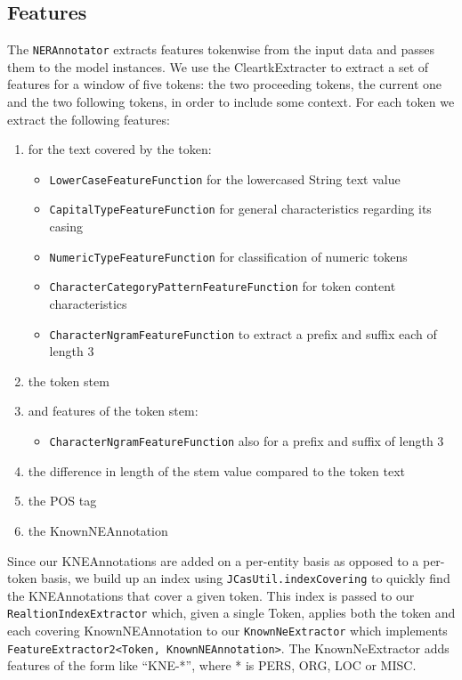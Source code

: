 \documentclass{article}
\begin{document}
\subsection{Features}\label{sec:features}
The \texttt{NERAnnotator} extracts features tokenwise from the input data and passes them to the model instances. We use the CleartkExtracter to extract a set of features for a window of five tokens: the two proceeding tokens, the current one and the two following tokens, in order to include some context. For each token we extract the following features:
\begin{enumerate}
	\item for the text covered by the token:
		\begin{itemize}
			\item \texttt{LowerCaseFeatureFunction} for the lowercased String text value
			\item \texttt{CapitalTypeFeatureFunction} for general characteristics regarding its casing
			\item \texttt{NumericTypeFeatureFunction} for classification of numeric tokens
			\item \texttt{CharacterCategoryPatternFeatureFunction} for token content characteristics
			\item \texttt{CharacterNgramFeatureFunction} to extract a prefix and suffix each of length 3
		\end{itemize}
	\item the token stem
	\item and features of the token stem:
		\begin{itemize}
			\item \texttt{CharacterNgramFeatureFunction} also for a prefix and suffix of length 3
		\end{itemize}
	\item the difference in length of the stem value compared to the token text
	\item the POS tag
	\item the KnownNEAnnotation
\end{enumerate}
Since our KNEAnnotations are added on a per-entity basis as opposed to a per-token basis, we build up an index using \texttt{JCasUtil.indexCovering} to quickly find the KNEAnnotations that cover a given token.
This index is passed to our \texttt{RealtionIndexExtractor} which, given a single Token, applies both the token and each covering KnownNEAnnotation to our \texttt{KnownNeExtractor} which implements \texttt{FeatureExtractor2<Token, KnownNEAnnotation>}. The KnownNeExtractor adds features of the form like \enquote{KNE-*}, where * is PERS, ORG, LOC or MISC.
\end{document}
